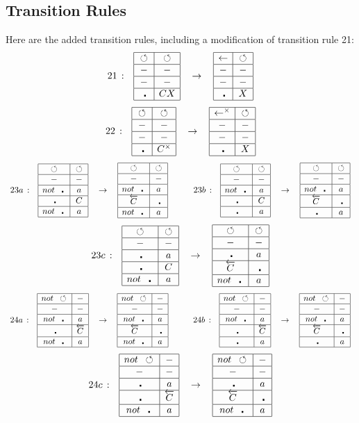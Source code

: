 \documentclass[11pt,letterpaper]{article}
\newcommand{\<}{\langle}
\renewcommand{\>}{\rangle}
\newcommand{\tur}{\,\circlearrowleft\,}   %
\newcommand{\bul}{\:\:\centerdot\:}       %
\newcommand{\goes}{\:\rightarrow\:}		%
\newcommand{\eight}[8]{ 		%
	\begin{array}{|c|c|}
	\hline #1 & #2 \\
	\hline #3 & #4 \\
	\hline #5 & #6 \\
	\hline #7 & #8 \\
	\hline
	\end{array}}
\newcommand{\ten}[8]{ 		%
	\begin{array}{|c|c|}
	\hline #1 & #2 \\
	\hline - & - \\
	\hline #3 & #4 \\
	\hline #5 & #6 \\
	\hline #7 & #8 \\
	\hline
	\end{array}}
\begin{document}
\subsection{Transition Rules}
Here are the added transition rules, including a modification of transition rule 21:
\begin{eqnarray}
	\begin{array}{rccccrccc}
	21\,:& 
		\eight{\tur}{\tur}{-}{-}{-}{-}{\bul}{CX}
		&\goes&
		\eight{\leftarrow}{\tur}{-}{-}{-}{-}{\bul}{X}
	\end{array}
\end{eqnarray}
\begin{eqnarray}
	\begin{array}{rccccrccc}
	22\,:& 
		\eight{\tur}{\tur}{-}{-}{-}{-}{\bul}{C^{\times}}
		&\goes&
		\eight{\leftarrow^{\times}}{\tur}{-}{-}{-}{-}{\bul}{X}
	\end{array}	\label{rule22}
\end{eqnarray}
\begin{eqnarray}
	\begin{array}{rccccrccc}
	23a\,:& 
		\ten{\tur}{\tur}{not~\bul}{a}{\bul}{C}{not~\bul}{a}
		&\goes&
		\ten{\tur}{\tur}{not~\bul}{a}{\overleftarrow{C}}{\bul}{not~\bul}{a}
	&\quad&
	23b\,:& 
			\ten{\tur}{\tur}{not~\bul}{a}{\bul}{C}{\bul}{a}
			&\goes&
			\ten{\tur}{\tur}{not~\bul}{a}{\overleftarrow{C}}{\bul}{\bul}{a}
	\end{array}
\end{eqnarray}
\begin{eqnarray}
	\begin{array}{rccccrccc}
	23c\,:& 
		\ten{\tur}{\tur}{\bul}{a}{\bul}{C}{not~\bul}{a}
		&\goes&
		\ten{\tur}{\tur}{\bul}{a}{\overleftarrow{C}}{\bul}{not~\bul}{a}
	\end{array}\nonumber
\end{eqnarray}
\begin{eqnarray}
	\begin{array}{rccccrccc}
	24a\,:& 
		\ten{not~\tur}{-}{not~\bul}{a}{\bul}{\overleftarrow{C}}{not~\bul}{a}
		&\goes&
		\ten{not~\tur}{-}{not~\bul}{a}{\overleftarrow{C}}{\bul}{not~\bul}{a}
	&\quad&
	24b\,:& 
		\ten{not~\tur}{-}{not~\bul}{a}{\bul}{\overleftarrow{C}}{\bul}{a}
		&\goes&
		\ten{not~\tur}{-}{not~\bul}{a}{\overleftarrow{C}}{\bul}{\bul}{a}
	\end{array}
\end{eqnarray}
\begin{eqnarray}
	\begin{array}{rccccrccc}
	24c\,:& 
		\ten{not~\tur}{-}{\bul}{a}{\bul}{\overleftarrow{C}}{not~\bul}{a}
		&\goes&
		\ten{not~\tur}{-}{\bul}{a}{\overleftarrow{C}}{\bul}{not~\bul}{a}
	\end{array}\nonumber
\end{eqnarray}
\end{document}
